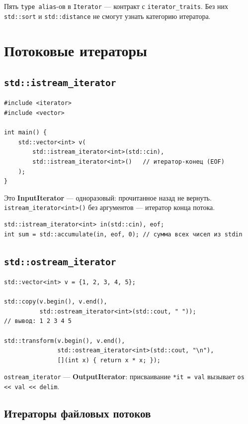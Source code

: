 \documentclass[a4paper,12pt]{article}
\begin{document}
Пять \texttt{type alias}-ов в \texttt{Iterator} --- контракт с
\texttt{iterator\_traits}. Без них \texttt{std::sort} и
\texttt{std::distance} не смогут узнать категорию итератора.

\section{Потоковые итераторы}

\subsection{\texttt{std::istream\_iterator}}

\begin{lstlisting}
#include <iterator>
#include <vector>

int main() {
    std::vector<int> v(
        std::istream_iterator<int>(std::cin),
        std::istream_iterator<int>()   // итератор-конец (EOF)
    );
}
\end{lstlisting}

Это \textbf{InputIterator} --- одноразовый: прочитанное назад не вернуть.
\texttt{istream\_iterator<int>()} без аргументов --- итератор конца потока.

\begin{lstlisting}
std::istream_iterator<int> in(std::cin), eof;
int sum = std::accumulate(in, eof, 0); // сумма всех чисел из stdin
\end{lstlisting}

\subsection{\texttt{std::ostream\_iterator}}

\begin{lstlisting}
std::vector<int> v = {1, 2, 3, 4, 5};

std::copy(v.begin(), v.end(),
          std::ostream_iterator<int>(std::cout, " "));
// вывод: 1 2 3 4 5

std::transform(v.begin(), v.end(),
               std::ostream_iterator<int>(std::cout, "\n"),
               [](int x) { return x * x; });
\end{lstlisting}

\texttt{ostream\_iterator} --- \textbf{OutputIterator}: присваивание
\texttt{*it = val} вызывает \texttt{os << val << delim}.

\subsection{Итераторы файловых потоков}
\end{document}
